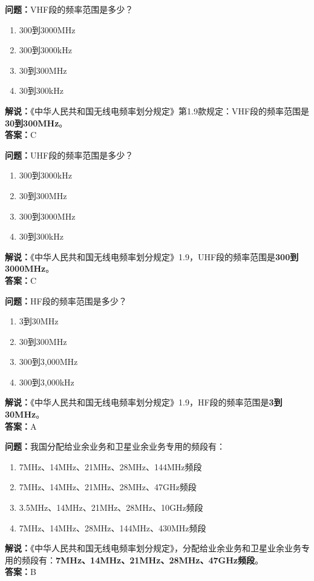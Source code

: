\documentclass{ctexbook}
\begin{document}
\bigskip


\noindent\textbf{问题：}VHF段的频率范围是多少？
\begin{enumerate}[label=\Alph*), leftmargin=3em]
	\item 300到3000MHz
	\item 300到3000kHz
	\item 30到300MHz
	\item 30到300kHz
\end{enumerate}
\noindent\textbf{解说：}《中华人民共和国无线电频率划分规定》第1.9款规定：VHF段的频率范围是\textbf{30到300MHz}。\\\noindent\textbf{答案：}C

\bigskip


\noindent\textbf{问题：}UHF段的频率范围是多少？
\begin{enumerate}[label=\Alph*), leftmargin=3em]
	\item 300到3000kHz
	\item 30到300MHz
	\item 300到3000MHz
	\item 30到300kHz
\end{enumerate}
\noindent\textbf{解说：}《中华人民共和国无线电频率划分规定》1.9，UHF段的频率范围是\textbf{300到3000MHz}。\\\noindent\textbf{答案：}C


\bigskip


\noindent\textbf{问题：}HF段的频率范围是多少？
\begin{enumerate}[label=\Alph*), leftmargin=3em]
	\item 3到30MHz
	\item 30到300MHz
	\item 300到3,000MHz
	\item 300到3,000kHz
\end{enumerate}
\noindent\textbf{解说：}《中华人民共和国无线电频率划分规定》1.9，HF段的频率范围是\textbf{3到30MHz}。\\\noindent\textbf{答案：}A


\bigskip


\noindent\textbf{问题：}我国分配给业余业务和卫星业余业务专用的频段有：
\begin{enumerate}[label=\Alph*), leftmargin=3em]
	\item 7MHz、14MHz、21MHz、28MHz、144MHz频段
	\item 7MHz、14MHz、21MHz、28MHz、47GHz频段
	\item 3.5MHz、14MHz、21MHz、28MHz、10GHz频段
	\item 7MHz、14MHz、28MHz、144MHz、430MHz频段
\end{enumerate}
\noindent\textbf{解说：}《中华人民共和国无线电频率划分规定》，分配给业余业务和卫星业余业务专用的频段有：\textbf{7MHz、14MHz、21MHz、28MHz、47GHz频段}。\\\noindent\textbf{答案：}B
\end{document}

